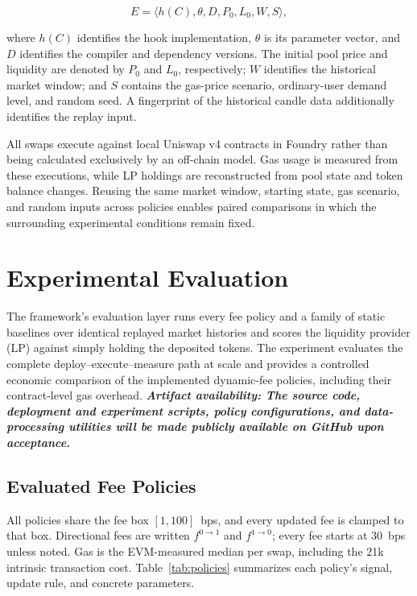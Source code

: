 \documentclass[a4paper,conference]{IEEEtran}
\begin{document}
\begin{equation}
  E=
  \langle h(C),\theta,D,P_0,L_0,W,S\rangle,
  \label{eq:manifest}
\end{equation}

where $h(C)$ identifies the hook implementation, $\theta$ is its
parameter vector, and $D$ identifies the compiler and dependency
versions. The initial pool price and liquidity are denoted by $P_0$
and $L_0$, respectively; $W$ identifies the historical market window;
and $S$ contains the gas-price scenario, ordinary-user demand level,
and random seed. A fingerprint of the historical candle data
additionally identifies the replay input.

All swaps execute against local Uniswap v4 contracts in Foundry rather
than being calculated exclusively by an off-chain model. Gas usage is
measured from these executions, while LP holdings are reconstructed
from pool state and token balance changes. Reusing the same market
window, starting state, gas scenario, and random inputs across policies
enables paired comparisons in which the surrounding experimental
conditions remain fixed.

\section{Experimental Evaluation}
\label{sec:evaluation}

The framework's evaluation layer runs every fee policy and a family of
static baselines over identical replayed market histories and scores the
liquidity provider (LP) against simply holding the deposited tokens.
The experiment evaluates the complete deploy--execute--measure path at scale and provides a controlled economic comparison of the implemented dynamic-fee policies, including their contract-level gas overhead. \textbf{\textit{Artifact availability: The source code, deployment and experiment scripts, policy configurations, and data-processing utilities will be made publicly available on GitHub upon acceptance.}}

\subsection{Evaluated Fee Policies}

All policies share the fee box $[1,100]$~bps, and every updated fee is
clamped to that box.
Directional fees are written $f^{0\to1}$ and $f^{1\to0}$; every fee starts at 30~bps unless
noted. Gas is the EVM-measured median per swap, including the 21k
intrinsic transaction cost. Table~\ref{tab:policies} summarizes each
policy's signal, update rule, and concrete parameters.
\end{document}
